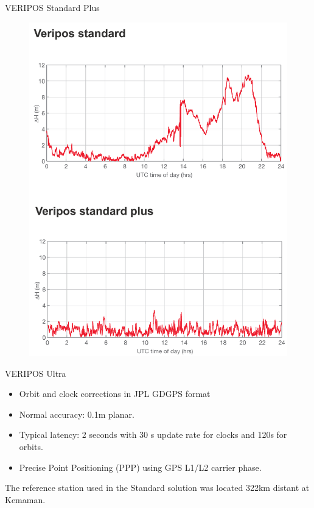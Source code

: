 \documentclass[12pt]{beamer}
\begin{document}
\begin{frame}[plain]{VERIPOS Standard Plus}
	
	\begin{figure}
		\includegraphics[height=0.9\textheight]{pic/StdPlus.png}
	\end{figure}

\end{frame}


\begin{frame}{VERIPOS Ultra}
 
	\begin{itemize}	
		\item Orbit and clock corrections in JPL GDGPS format
		\item Normal accuracy: 0.1m planar. 
		\item Typical latency: 2 seconds with 30 s update rate for clocks and 120s for orbits.
		\item Precise Point Positioning (PPP) using GPS L1/L2 carrier phase.
	\end{itemize}	
	
The reference station used in the Standard solution was located 322km distant at Kemaman.
\end{frame}	
\end{document}

